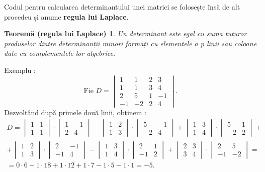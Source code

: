 Codul pentru calcularea determinantului unei matrici se folosește însă de alt
procedeu și anume \textbf{regula lui Laplace}.
\newtheorem*{th_laplace_rule}{Teoremă (regula lui Laplace)}
\begin{th_laplace_rule}
Un determinant este egal cu suma tuturor produselor dintre determinanții minori
formați cu elementele a \textit{p} linii sau coloane date cu complementele lor
algebrice.
\end{th_laplace_rule}
Exemplu :
\begin{equation*}
\text{Fie } D = 
\begin{vmatrix}
1 & 1 & 2 & 3 \\
1 & 1 & 3 & 4 \\
2 & 5 & 1 & -1 \\
-1 & -2 & 2 & 4
\end{vmatrix}.
\end{equation*}
Dezvoltând după primele două linii, obținem :
\begin{align*}
D =
\begin{vmatrix}
1 & 1 \\
1 & 1
\end{vmatrix} \cdot
\begin{vmatrix}
1 & -1 \\
2 & 4
\end{vmatrix} -
\begin{vmatrix}
1 & 2 \\
1 & 3
\end{vmatrix} \cdot
\begin{vmatrix}
5 & -1 \\
-2 & 4
\end{vmatrix} +
\begin{vmatrix}
1 & 3 \\
1 & 4
\end{vmatrix} \cdot
\begin{vmatrix}
5 & 1 \\
-2 & 2
\end{vmatrix} + \\ +
\begin{vmatrix}
1 & 2 \\
1 & 3
\end{vmatrix} \cdot
\begin{vmatrix}
2 & -1 \\
-1 & 4
\end{vmatrix} -
\begin{vmatrix}
1 & 3 \\
1 & 4
\end{vmatrix} \cdot
\begin{vmatrix}
2 & 1 \\
-1 & 2
\end{vmatrix} +
\begin{vmatrix}
2 & 3 \\
3 & 4
\end{vmatrix} \cdot
\begin{vmatrix}
2 & 5 \\
-1 & -2
\end{vmatrix} = \\
= 0 \cdot 6 - 1 \cdot 18 + 1 \cdot 12 + 1 \cdot 7 - 1 \cdot 5 - 1 \cdot 1
= -5.
\end{align*}

